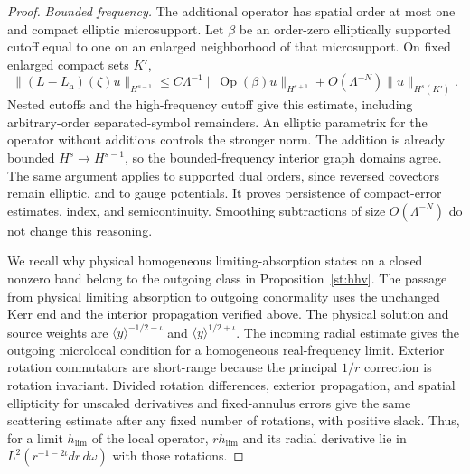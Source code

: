 \begin{proof}
\emph{Bounded frequency.}
The additional operator has spatial order at most one and compact
elliptic microsupport.  Let $\beta$ be an order-zero elliptically
supported cutoff equal to one on an enlarged neighborhood of that
microsupport.  On fixed enlarged compact sets $K'$,
\begin{equation}\label{st:elliptic-smallness}
 \|(L-L_{\mathrm h})(\zeta)u\|_{H^{s-1}}
 \leq C\Lambda^{-1}
       \|\operatorname{Op}(\beta)u\|_{H^{s+1}}
       +O(\Lambda^{-N})\|u\|_{H^s(K')}.
\end{equation}
Nested cutoffs and the high-frequency cutoff give this estimate,
including arbitrary-order separated-symbol remainders.  An elliptic
parametrix for the operator without additions controls the stronger
norm.  The addition is already bounded $H^s\to H^{s-1}$, so the
bounded-frequency interior graph domains agree.  The same argument
applies to supported dual orders, since reversed covectors remain
elliptic, and to gauge potentials.  It proves persistence of
compact-error estimates, index, and semicontinuity.  Smoothing
subtractions of size $O(\Lambda^{-N})$ do not change this reasoning.

We recall why physical homogeneous limiting-absorption states on
a closed nonzero band belong to the outgoing class in
Proposition~\ref{st:hhv}.  The passage from physical limiting
absorption to outgoing conormality uses the unchanged Kerr end and
the interior propagation verified above.  The physical solution and
source weights are $\langle y\rangle^{-1/2-\iota}$ and
$\langle y\rangle^{1/2+\iota}$.  The incoming radial estimate gives
the outgoing microlocal condition for a homogeneous real-frequency
limit.  Exterior rotation commutators are short-range because the
principal $1/r$ correction is rotation invariant.  Divided rotation
differences, exterior propagation, and spatial ellipticity for
unscaled derivatives and fixed-annulus errors give the same
scattering estimate after any fixed number of rotations, with
positive slack.  Thus, for a limit $h_{\mathrm{lim}}$ of the local
operator, $rh_{\mathrm{lim}}$ and its radial derivative lie in
$L^2(r^{-1-2\iota}dr\,d\omega)$ with those rotations.


\end{proof}
